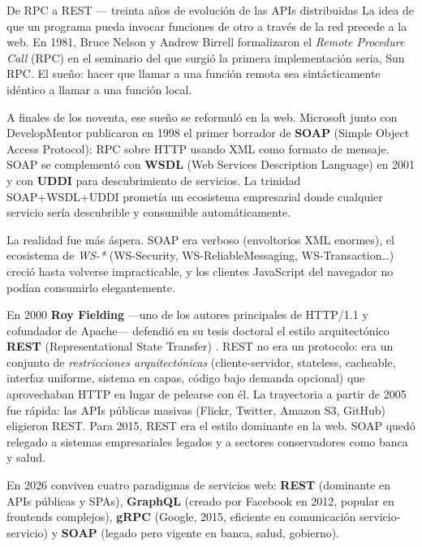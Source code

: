 \documentclass[11pt,a4paper,openany]{book}
\begin{document}
\begin{cajahistoria}{De RPC a REST --- treinta años de evolución de las APIs distribuidas}
La idea de que un programa pueda invocar funciones de otro a través
de la red precede a la web. En 1981, Bruce Nelson y Andrew Birrell
formalizaron el \emph{Remote Procedure Call} (RPC) en el seminario
del que surgió la primera implementación seria, Sun RPC. El sueño:
hacer que llamar a una función remota sea sintácticamente idéntico
a llamar a una función local.

A finales de los noventa, ese sueño se reformuló en la web. Microsoft
junto con DevelopMentor publicaron en 1998 el primer borrador de
\textbf{SOAP} (Simple Object Access Protocol): RPC sobre HTTP usando
XML como formato de mensaje. SOAP se complementó con \textbf{WSDL}
(Web Services Description Language) en 2001 y con \textbf{UDDI} para
descubrimiento de servicios. La trinidad SOAP+WSDL+UDDI prometía un
ecosistema empresarial donde cualquier servicio sería descubrible y
consumible automáticamente.

La realidad fue más áspera. SOAP era verboso (envoltorios XML
enormes), el ecosistema de \emph{WS-*} (WS-Security, WS-ReliableMessaging,
WS-Transaction\dots) creció hasta volverse impracticable, y los
clientes JavaScript del navegador no podían consumirlo elegantemente.

En 2000 \textbf{Roy Fielding} —uno de los autores principales de
HTTP/1.1 y cofundador de Apache— defendió en su tesis doctoral el
estilo arquitectónico \textbf{REST} (Representational State Transfer)
\cite{fielding2000rest}. REST no era un protocolo: era un conjunto de
\emph{restricciones arquitectónicas} (cliente-servidor, stateless,
cacheable, interfaz uniforme, sistema en capas, código bajo demanda
opcional) que aprovechaban HTTP en lugar de pelearse con él. La
trayectoria a partir de 2005 fue rápida: las APIs públicas masivas
(Flickr, Twitter, Amazon S3, GitHub) eligieron REST. Para 2015, REST
era el estilo dominante en la web. SOAP quedó relegado a sistemas
empresariales legados y a sectores conservadores como banca y salud.

En 2026 conviven cuatro paradigmas de servicios web: \textbf{REST}
(dominante en APIs públicas y SPAs), \textbf{GraphQL} (creado por
Facebook en 2012, popular en frontends complejos), \textbf{gRPC}
(Google, 2015, eficiente en comunicación servicio-servicio) y
\textbf{SOAP} (legado pero vigente en banca, salud, gobierno).
\end{cajahistoria}
\end{document}
